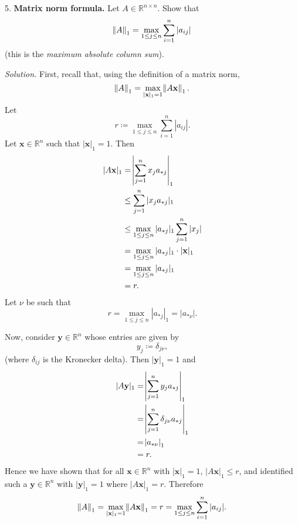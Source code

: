 \documentclass{article}
\def\*#1{\mathbf{#1}}
\newcommand{\R}{\mathbb{R}}
\begin{document}
5. \textbf{Matrix norm formula.}
Let $A \in \R^{n \times n}$. Show that
%
\begin{equation*}
    \enVert{A}_1 = \max_{1 \leq j \leq n} \sum_{i = 1}^n |a_{ij}|
\end{equation*}
%
(this is the \textit{maximum absolute column sum}).

\textit{Solution.}
First, recall that, using the definition of a matrix norm,
%
\begin{equation*}
    \enVert{A}_1 = \max_{|\*x|_1 = 1} \enVert{A \*x}_1
    .
\end{equation*}
%
Let
%
\begin{equation*}
    r \coloneqq \max_{1 \leq j \leq n} \sum_{i = 1}^n |a_{ij}|
    .
\end{equation*}
%
Let $\*x \in \R^n$ such that $|\*x|_1 = 1$. Then
%
\begin{align*}
    |A \*x|_1
        &= \envert{\sum_{j = 1}^n x_j a_{*j}}_1 \\
        &\leq \sum_{j = 1}^n |x_j a_{*j}|_1 \\
        &\leq \max_{1 \leq j \leq n} |a_{*j}|_1 \sum_{j = 1}^n |x_j| \\
        &= \max_{1 \leq j \leq n} |a_{*j}|_1 \cdot |\*x|_1 \\
        &= \max_{1 \leq j \leq n} |a_{*j}|_1 \\
        &= r
        .
\end{align*}
%
Let $\nu$ be such that
%
\begin{equation*}
    r = \max_{1 \leq j \leq n} |a_{*j}|_1 = |a_{* \nu}|
    .
\end{equation*}

Now, consider $\*y \in \R^n$ whose entries are given by
%
\begin{equation*}
    y_j \coloneqq \delta_{j \nu}
    ,
\end{equation*}
%
(where $\delta_{i j}$ is the Kronecker delta).
%
Then $|\*y|_1 = 1$ and
%
\begin{align*}
    |A \*y|_1
        &= \envert{\sum_{j = 1}^n y_j a_{*j}}_1 \\
        &= \envert{\sum_{j = 1}^n \delta_{j \nu} a_{*j}}_1 \\
        &= \envert{a_{* \nu}}_1 \\
        &= r
        .
\end{align*}
%
Hence we have shown that for all $\*x \in \R^n$ with $|\*x|_1 = 1$, $|A\*x|_1 \leq r$,
and identified such a $\*y \in \R^n$ with $|\*y|_1 = 1$ where $|A\*x|_1 = r$.
Therefore
%
\begin{equation*}
    \enVert{A}_1
        = \max_{|\*x|_1 = 1} \enVert{A \*x}_1
        = r
        = \max_{1 \leq j \leq n} \sum_{i = 1}^n |a_{ij}|
    .
\end{equation*}
\end{document}
